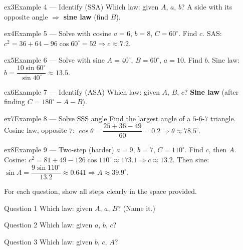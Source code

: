 \documentclass[11pt]{article}
\begin{document}
\begin{example}{ex3}{Example 4 --- Identify (SSA)}
Which law: given $A$, $a$, $b$?
\soln A side with its opposite angle $\Rightarrow$ \textbf{sine law} (find $B$).
\end{example}

\begin{example}{ex4}{Example 5 --- Solve with cosine}
$a=6$, $b=8$, $C=60^\circ$. Find $c$.
\soln SAS: $c^2=36+64-96\cos60^\circ=52\Rightarrow c\approx7.2.$
\end{example}

\begin{example}{ex5}{Example 6 --- Solve with sine}
$A=40^\circ$, $B=60^\circ$, $a=10$. Find $b$.
\soln Sine law: $b=\dfrac{10\sin60^\circ}{\sin40^\circ}\approx13.5.$
\end{example}

\begin{example}{ex6}{Example 7 --- Identify (ASA)}
Which law: given $A$, $B$, $c$?
\soln \textbf{Sine law} (after finding $C=180^\circ-A-B$).
\end{example}

\begin{example}{ex7}{Example 8 --- Solve SSS angle}
Find the largest angle of a $5$-$6$-$7$ triangle.
\soln Cosine law, opposite $7$: $\cos\theta=\dfrac{25+36-49}{60}=0.2\Rightarrow\theta\approx78.5^\circ.$
\end{example}

\begin{example}{ex8}{Example 9 --- Two-step (harder)}
$a=9$, $b=7$, $C=110^\circ$. Find $c$, then $A$.
\soln Cosine: $c^2=81+49-126\cos110^\circ\approx173.1\Rightarrow c\approx13.2$. Then sine: $\sin A=\dfrac{9\sin110^\circ}{13.2}\approx0.641\Rightarrow A\approx39.9^\circ.$
\end{example}

\clearpage
{}
For each question, show all steps clearly in the space provided.

\begin{qbox}{Question 1}
Which law: given $A$, $a$, $B$? (Name it.)\workspace{1.8cm}
\end{qbox}

\begin{qbox}{Question 2}
Which law: given $a$, $b$, $c$?\workspace{1.8cm}
\end{qbox}

\begin{qbox}{Question 3}
Which law: given $b$, $c$, $A$?\workspace{1.8cm}
\end{qbox}
\end{document}
